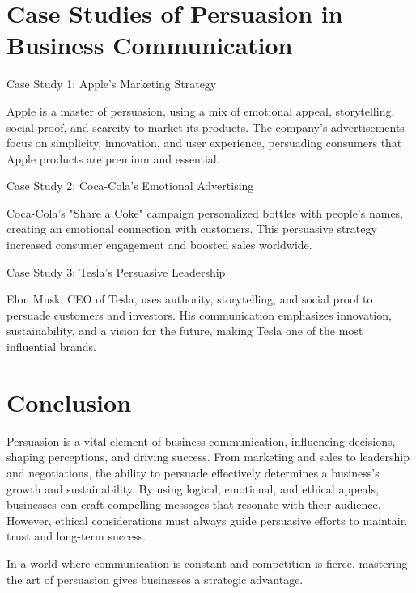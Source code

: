 \documentclass[a4paper]{article}
\begin{document}
\section{Case Studies of Persuasion in Business Communication}

Case Study 1: Apple’s Marketing Strategy

Apple is a master of persuasion, using a mix of emotional appeal, storytelling, social proof, and scarcity to market its products. The company’s advertisements focus on simplicity, innovation, and user experience, persuading consumers that Apple products are premium and essential.

Case Study 2: Coca-Cola’s Emotional Advertising

Coca-Cola’s "Share a Coke" campaign personalized bottles with people’s names, creating an emotional connection with customers. This persuasive strategy increased consumer engagement and boosted sales worldwide.

Case Study 3: Tesla’s Persuasive Leadership

Elon Musk, CEO of Tesla, uses authority, storytelling, and social proof to persuade customers and investors. His communication emphasizes innovation, sustainability, and a vision for the future, making Tesla one of the most influential brands.

\section{Conclusion}

Persuasion is a vital element of business communication, influencing decisions, shaping perceptions, and driving success. From marketing and sales to leadership and negotiations, the ability to persuade effectively determines a business’s growth and sustainability. By using logical, emotional, and ethical appeals, businesses can craft compelling messages that resonate with their audience. However, ethical considerations must always guide persuasive efforts to maintain trust and long-term success.

In a world where communication is constant and competition is fierce, mastering the art of persuasion gives businesses a strategic advantage.
\end{document}
